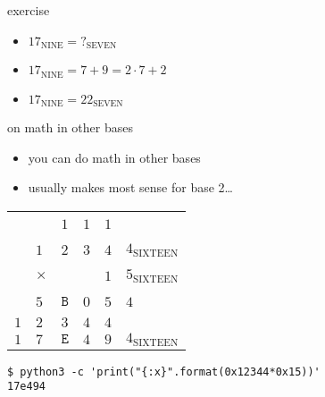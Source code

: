 \begin{frame}{exercise}
    \begin{itemize}
    \item $17_\text{NINE} = ?_\text{SEVEN}$
    \item<2> $17_\text{NINE} = 7 + 9 = 2\cdot 7 + 2$
    \item<2> $17_\text{NINE} = 22_\text{SEVEN}$
    \end{itemize}
\end{frame}

\begin{frame}[fragile,label=otherBase]{on math in other bases}
    \begin{itemize}
    \item you can do math in other bases
    \item usually makes most sense for base 2\ldots
    \end{itemize}
\begin{tabular}{llllll}
    ~ &~   & \small$1$   & \small$1$  &  \small$1$  & ~  \\
    ~& $1$ & $2$ & $3$ &  $4$ & $4_\text{SIXTEEN}$ \\
    ~& $\times$ & ~ & ~ & $1$ & $5_\text{SIXTEEN}$ \\ \hline
    ~   &$5$  & $\mathtt{B}$ & $0$  & $5$  & $4$ \\
    $1$ & $2$ & $3$ & $4$ & $4$ & \\ \hline
    $1$ & $7$ & $\mathtt{E}$  & $4$  &  $9$  & $4_\text{SIXTEEN}$ \\
\end{tabular}
\begin{lstlisting}[language={}]
$ python3 -c 'print("{:x}".format(0x12344*0x15))'
17e494
\end{lstlisting}
\end{frame}
